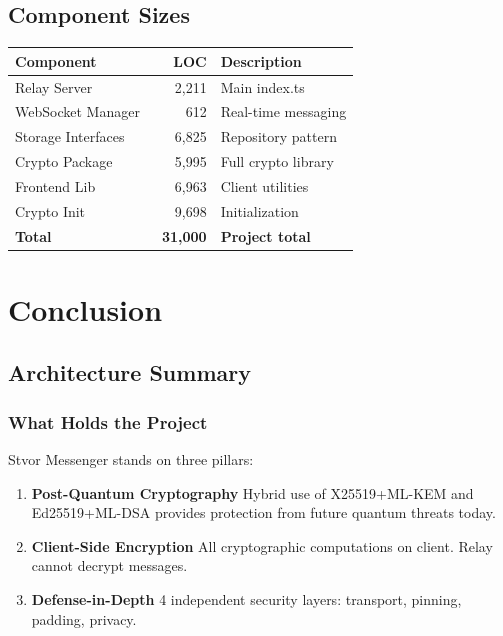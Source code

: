 \documentclass[11pt,a4paper,oneside]{book}
\begin{document}
\vspace{-0.5cm}\chapter{Component Sizes}
\begin{table}[h]
\centering
\begin{tabular}{|l|r|l|}
\hline
\textbf{Component} & \textbf{LOC} & \textbf{Description} \\
\hline
Relay Server & 2,211 & Main index.ts \\
\hline
WebSocket Manager & 612 & Real-time messaging \\
\hline
Storage Interfaces & 6,825 & Repository pattern \\
\hline
Crypto Package & 5,995 & Full crypto library \\
\hline
Frontend Lib & 6,963 & Client utilities \\
\hline
Crypto Init & 9,698 & Initialization \\
\hline
\textbf{Total} & \textbf{~31,000} & \textbf{Project total} \\
\hline
\end{tabular}
\end{table}
\vspace{-1cm}\part{Conclusion}
\vspace{-0.5cm}\chapter{Architecture Summary}
\vspace{-0.3cm}\section{What Holds the Project}
Stvor Messenger stands on three pillars:
\begin{enumerate}
  \item \textbf{Post-Quantum Cryptography}
  Hybrid use of X25519+ML-KEM and Ed25519+ML-DSA provides protection from future quantum threats today.
  \item \textbf{Client-Side Encryption}
  All cryptographic computations on client. Relay cannot decrypt messages.
  \item \textbf{Defense-in-Depth}
  4 independent security layers: transport, pinning, padding, privacy.
\end{enumerate}
\end{document}
